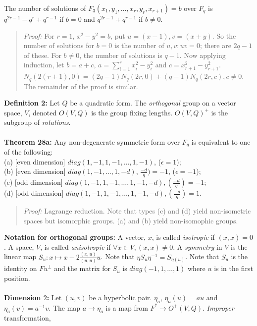 The number of solutions of 
$F_3(x_1, y_1, \ldots, x_r, y_r, x_{r+1})=b$ over $F_{q}$ is
$q^{2r-1}-q^{r} + q^{r-1}$ if $b = 0$ and
$q^{2r-1}+q^{r-1}$ if $b \ne 0$.
\begin{quote}
\emph{Proof:} For $r=1$, $x^2-y^2=b$, put $u=(x-1), v=(x+y)$.  So the number of solutions for 
$b=0$ is the number of $u,v: uv=0$; there are $2q-1$ of these.  For $b \ne 0$, the
number of solutions is $q-1$.  Now applying induction, let $b= a+c$, 
$a= \sum_{i=1}^r x_i^2-y_i^2$ and $c= x_{r+1}^2-y_{r+1}^2$.
$N_q(2(r+1),0) = (2q-1) N_q(2r,0) + (q-1) N_q(2r,c), c \ne 0$.  The remainder of the proof is
similar.
\end{quote}
{\bf Definition 2:} Let $Q$ be a quadratic form.
The \emph{orthogonal} group on a vector
space, $V$, denoted $O(V,Q)$ is the
group fixing lengths.
$O(V,Q)^+$ is the subgroup of \emph{rotations}. 
\\
\\
{\bf Theorem 28a:} Any non-degenerate symmetric form over $F_q$ is equivalent to one of the following:\\
(a) [even dimension] $diag(1, -1, 1, -1 , \ldots , 1, -1)$, ($\epsilon = 1$);\\
(b) [even dimension] $diag(1,-1, \ldots , 1, -d)$, ${\frac {-d} {q}}) = -1$, ($\epsilon = -1$); \\
(c) [odd dimension] $diag(1, -1, 1, -1 , \ldots , 1, -1, -d), ({\frac {-d} {q}}) = -1$; \\
(d) [odd dimension] $diag(1, -1, 1, -1 , \ldots , 1, -1, -d), ({\frac {-d} q}) = 1$.
\begin{quote}
\emph{Proof:} Lagrange reduction. Note that types (c) and (d) yield non-isometric spaces but isomorphic
groups.  (a) and (b) yield non-isomophic groups.
\end{quote}
{\bf Notation for orthogonal groups:}
A vector, $x$, is called \emph{isotropic} if $(x, x) = 0$.
A space, $V$, is called \emph{anisotropic} if $\forall x \in V, (x, x) \ne 0$.
A \emph{symmetry} in $V$ is the linear map
$S_u : x \mapsto x - 2 {\frac {(x,u)} {(u,u)}} u$.  Note that $\eta S_u \eta^{-1}= S_{\eta(u)}$.
Note that $S_u$ is the identity on $Fu^{\perp}$ and the matrix for $S_u$ is
$diag(-1, 1, \ldots , 1)$ where $u$ is in the first position.
\\
\\
{\bf Dimension $2$:}
Let $(u, v)$ be a hyperbolic pair.  $\eta_a$, 
$\eta_a(u)= au$ and
$\eta_a(v)= a^{-1}v$.  The map $a \rightarrow \eta_a$ is a map from
$F^* \rightarrow O^+(V,Q)$.  \emph{Improper} transformation, 
